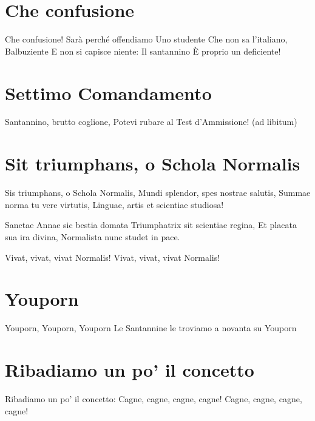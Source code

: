 \section{Che confusione}
\subtitle{Basata su “Sarà perché ti amo” dei Ricchi e Poveri}
\begin{canzone}
Che confusione!
Sarà perché offendiamo
Uno studente
Che non sa l’italiano,
Balbuziente
E non si capisce niente:
Il santannino
È proprio un deficiente!
\end{canzone}

\section{Settimo Comandamento}
\begin{canzone}
Santannino, brutto coglione,
Potevi rubare al Test d'Ammissione!
(ad libitum)
\end{canzone}

\section{Sit triumphans, o Schola Normalis}
\subtitle{Sulla melodia di “Salve invicta Juditha formosa” di A. Vivaldi}

\subtitle{Ogni verso si canta due volte}
\begin{canzone}
Sis triumphans, o Schola Normalis,
Mundi splendor, spes nostrae salutis,
Summae norma tu vere virtutis,
Linguae, artis et scientiae studiosa!

Sanctae Annae sic bestia domata
Triumphatrix sit scientiae regina,
Et placata sua ira divina,
Normalista nunc studet in pace.

Vivat, vivat, vivat Normalis!
Vivat, vivat, vivat Normalis!
\end{canzone}

\section{Youporn}
\subtitle{Sul ritornello di “Carneval de Paris” di Wender e Paolo Noise}
\begin{canzone}
Youporn, Youporn, Youporn
Le Santannine le troviamo
a novanta su Youporn
\end{canzone}

\section{Ribadiamo un po' il concetto}
\subtitle{Usualmente cantato dopo “Youporn”}
\begin{canzone}
  Ribadiamo un po' il concetto:
  Cagne, cagne, cagne, cagne!
  Cagne, cagne, cagne, cagne!
\end{canzone}

